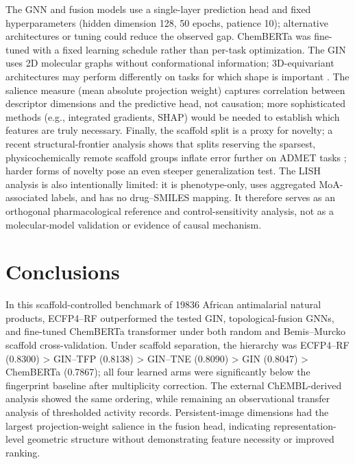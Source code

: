 \documentclass[11pt,a4paper]{article}
\begin{document}
The GNN and fusion models use a single-layer prediction head and fixed hyperparameters (hidden dimension \num{128}, \num{50} epochs, patience \num{10}); alternative architectures or tuning could reduce the observed gap. ChemBERTa was fine-tuned with a fixed learning schedule rather than per-task optimization. The GIN uses 2D molecular graphs without conformational information; 3D-equivariant architectures may perform differently on tasks for which shape is important \citep{rollins2024molprop}. The salience measure (mean absolute projection weight) captures correlation between descriptor dimensions and the predictive head, not causation; more sophisticated methods (e.g., integrated gradients, SHAP) would be needed to establish which features are truly necessary. Finally, the scaffold split is a proxy for novelty; a recent structural-frontier analysis shows that splits reserving the sparsest, physicochemically remote scaffold groups inflate error further on ADMET tasks \citep{scaffold_frontier_2026}; harder forms of novelty pose an even steeper generalization test. The LISH analysis is also intentionally limited: it is phenotype-only, uses aggregated MoA-associated labels, and has no drug--SMILES mapping. It therefore serves as an orthogonal pharmacological reference and control-sensitivity analysis, not as a molecular-model validation or evidence of causal mechanism.

\section{Conclusions}

In this scaffold-controlled benchmark of \num{19836} African antimalarial natural products, ECFP4--RF outperformed the tested GIN, topological-fusion GNNs, and fine-tuned ChemBERTa transformer under both random and Bemis--Murcko scaffold cross-validation. Under scaffold separation, the hierarchy was ECFP4--RF (\num{0.8300}) > GIN--TFP (\num{0.8138}) > GIN--TNE (\num{0.8090}) > GIN (\num{0.8047}) > ChemBERTa (\num{0.7867}); all four learned arms were significantly below the fingerprint baseline after multiplicity correction. The external ChEMBL-derived analysis showed the same ordering, while remaining an observational transfer analysis of thresholded activity records. Persistent-image dimensions had the largest projection-weight salience in the fusion head, indicating representation-level geometric structure without demonstrating feature necessity or improved ranking.
\end{document}
